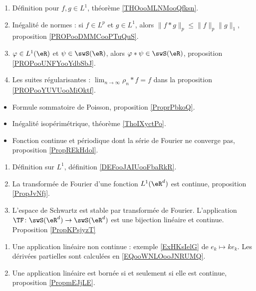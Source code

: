 \begin{enumerate}
    \item
        Définition pour \( f,g\in L^1\), théorème \ref{THOooMLNMooQfksn}.
    \item
        Inégalité de normes : si \( f\in L^p\) et \( g\in L^1\), alors \( \| f*g \|_p\leq \| f \|_p\| g \|_1\), proposition \ref{PROPooDMMCooPTuQuS}.
    \item
        \( \varphi\in L^1(\eR)\) et \( \psi\in\swS(\eR)\), alors \( \varphi * \psi\in \swS(\eR)\), proposition \ref{PROPooUNFYooYdbSbJ}.
    \item
        Les suites régularisantes : \( \lim_{n\to \infty} \rho_n*f=f\) dans la proposition \ref{PROPooYUVUooMiOktf}.
\end{enumerate}

\begin{itemize}
    \item Formule sommatoire de Poisson, proposition \ref{ProprPbkoQ}.
    \item Inégalité isopérimétrique, théorème \ref{ThoIXyctPo}.
    \item Fonction continue et périodique dont la série de Fourier ne converge pas, proposition \ref{PropREkHdol}.
\end{itemize}

\begin{enumerate}
    \item
        Définition sur \( L^1\), définition \ref{DEFooJAIUooFbaRkR}.
    \item
        La transformée de Fourier d'une fonction \( L^1(\eR^d)\) est continue, proposition \ref{PropJvNfj}.
    \item
    L'espace de Schwartz est stable par transformée de Fourier. L'application $\TF\colon \swS(\eR^d)\to \swS(\eR^d)$ est une bijection linéaire et continue. Proposition  \ref{PropKPsjyzT}
\end{enumerate}

\begin{enumerate}
    \item
        Une application linéaire non continue : exemple \ref{ExHKsIelG} de \( e_k\mapsto ke_k\). Les dérivées partielles sont calculées en \eqref{EQooWNLOooJNRUMQ}.
    \item
        Une application linéaire est bornée si et seulement si elle est continue, proposition \ref{PropmEJjLE}.
\end{enumerate}

